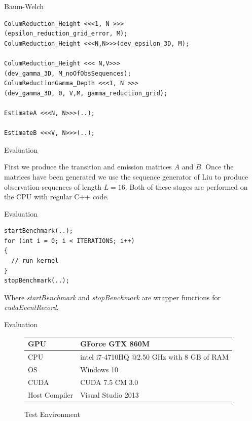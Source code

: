 \documentclass[11pt]{beamer}
\begin{document}
\begin{frame}[fragile]{Baum-Welch}
\begin{lstlisting}
ColumReduction_Height <<<1, N >>>
(epsilon_reduction_grid_error, M);
ColumReduction_Height <<<N,N>>>(dev_epsilon_3D, M);

ColumReduction_Height <<< N,V>>>
(dev_gamma_3D, M_noOfObsSequences);
ColumReductionGamma_Depth <<<1, N >>>
(dev_gamma_3D, 0, V,M, gamma_reduction_grid);

EstimateA <<<N, N>>>(..);

EstimateB <<<V, N>>>(..);
\end{lstlisting}
\end{frame}

\begin{frame}{Evaluation}

 First we produce the transition and emission matrices $A$ and $B$. 
 Once the matrices have been generated we use the sequence generator of Liu to produce observation sequences of length $L = 16$. Both of these stages are performed on the CPU with regular C++ code.

\end{frame}

\begin{frame}[fragile]{Evaluation}

\begin{lstlisting}
startBenchmark(..);
for (int i = 0; i < ITERATIONS; i++)
{
  // run kernel
}
stopBenchmark(..);
\end{lstlisting}
Where \textit{startBenchmark} and \textit{stopBenchmark} are wrapper functions for \textit{cudaEventRecord}.

\end{frame}

\begin{frame}{Evaluation}
\begin{figure}[H]
\centering
\begin{tabular}{|l|l|}
\hline
GPU &GForce GTX 860M \\ \hline
CPU & intel i7-4710HQ @2.50 GHz with 8 GB of RAM  \\ \hline
OS & Windows 10 \\ \hline
CUDA & CUDA 7.5 CM 3.0 \\ \hline
Host Compiler & Visual Studio 2013 \\ \hline

\end{tabular}

\caption{Test Environment}
\end{figure}
\end{frame}
\end{document}
